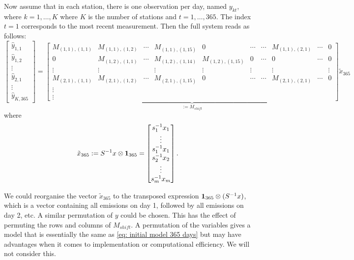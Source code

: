 \documentclass{article}
\begin{document}
Now assume that in each station, there is one observation per day, named $y_{kt}$, where $k = 1,\dots,K$ where $K$ is the number of stations and $t = 1,\dots,365$. The index $t=1$ corresponds to the most recent measurement. Then the full system reads as follows:
\begin{equation}
    \label{eq: initial model 365 days}
\begin{bmatrix}
    \hat{y}_{1,1} \\
    \hat{y}_{1,2} \\
    \vdots \\
    \hat{y}_{2,1} \\ 
    \vdots \\
    \hat{y}_{K,365}
\end{bmatrix}
=
\underbrace{
\begin{bmatrix}
    M_{(1,1), (1,1)} & M_{(1,1), (1,2)} & \cdots & M_{(1,1),(1,15)} & 0 & \cdots & \cdots & M_{(1,1), (2,1)} & \cdots & 0 \\
    0 & M_{(1,2), (1,1)} & \cdots & M_{(1,2), (1,14)} & M_{(1,2), (1,15)} & 0 & \cdots & 0 & \cdots & 0 \\
    \vdots & \vdots & & \vdots & \vdots & \vdots & & \vdots & & \vdots \\
    M_{(2,1), (1,1)} & M_{(2,1), (1,2)} & \cdots & M_{(2,1),(1,15)} & 0 & \cdots & \cdots & M_{(2,1), (2,1)} & \cdots & 0 \\
    \vdots \\
    \vdots
\end{bmatrix}
}_{ := M_{shift}}
\tilde{x}_{365}
\end{equation}
where 
$$
\tilde{x}_{365} := S^{-1} x \otimes \vb{1}_{365}
=
\begin{bmatrix}
    s_1^{-1} x_1 \\
    \vdots \\
    s_1^{-1} x_1 \\ 
    s_2^{-1} x_2 \\
    \vdots \\ 
    s_m^{-1} x_m
\end{bmatrix}
.$$

We could reorganise the vector $\tilde{x}_{365}$ to the transposed expression $\vb{1}_{365} \otimes (S^{-1} x)$, which is a vector containing all emissions on day 1, followed by all emissions on day 2, etc. A similar permutation of $y$ could be chosen. This has the effect of permuting the rows and columns of $M_{shift}$. A permutation of the variables gives a model that is essentially the same as \cref{eq: initial model 365 days} but may have advantages when it comes to implementation or computational efficiency. We will not consider this.
\end{document}
